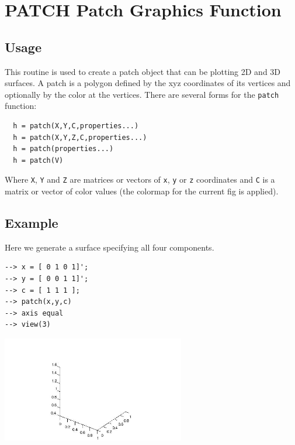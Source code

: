 \section{PATCH Patch Graphics Function}

\subsection{Usage}

This routine is used to create a patch object that can be plotting 2D and 3D surfaces.  A 
patch is a polygon defined by the xyz coordinates
of its vertices and optionally by the color at the vertices.
There are several forms for the \verb|patch| function:
\begin{verbatim}
  h = patch(X,Y,C,properties...)
  h = patch(X,Y,Z,C,properties...)
  h = patch(properties...)
  h = patch(V)
\end{verbatim}
Where \verb|X|, \verb|Y| and \verb|Z| are matrices or vectors of \verb|x|, \verb|y| or \verb|z| coordinates
and \verb|C| is a matrix or vector of color values (the colormap
for the current fig is applied).  
\subsection{Example}

Here we generate a surface specifying all four components.
\begin{verbatim}
--> x = [ 0 1 0 1]';
--> y = [ 0 0 1 1]';
--> c = [ 1 1 1 ];
--> patch(x,y,c)
--> axis equal
--> view(3)
\end{verbatim}


\centerline{\includegraphics[width=8cm]{patch1}}

